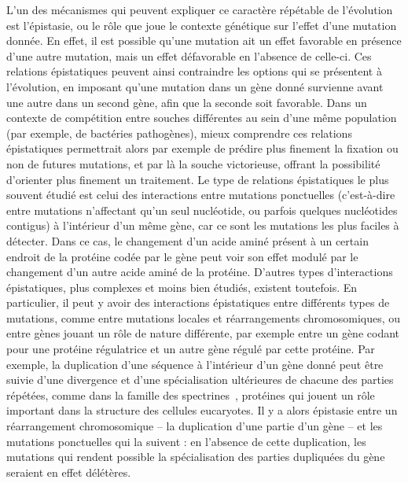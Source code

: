 L'un des mécanismes qui peuvent expliquer ce caractère répétable de l'évolution est l'épistasie, ou le rôle que joue le contexte génétique sur l'effet d'une mutation donnée.
En effet, il est possible qu'une mutation ait un effet favorable en présence d'une autre mutation, mais un effet défavorable en l'absence de celle-ci.
Ces relations épistatiques peuvent ainsi contraindre les options qui se présentent à l'évolution, en imposant qu'une mutation dans un gène donné survienne avant une autre dans un second gène, afin que la seconde soit favorable.
Dans un contexte de compétition entre souches différentes au sein d'une même population (par exemple, de bactéries pathogènes), mieux comprendre ces relations épistatiques permettrait alors par exemple de prédire plus finement la fixation ou non de futures mutations, et par là la souche victorieuse, offrant la possibilité d'orienter plus finement un traitement.
Le type de relations épistatiques le plus souvent étudié est celui des interactions entre mutations ponctuelles (c'est-à-dire entre mutations n'affectant qu'un seul nucléotide, ou parfois quelques nucléotides contigus) à l'intérieur d'un même gène, car ce sont les mutations les plus faciles à détecter.
Dans ce cas, le changement d'un acide aminé présent à un certain endroit de la protéine codée par le gène peut voir son effet modulé par le changement d'un autre acide aminé de la protéine.
D'autres types d'interactions épistatiques, plus complexes et moins bien étudiés, existent toutefois.
En particulier, il peut y avoir des interactions épistatiques entre différents types de mutations, comme entre mutations locales et réarrangements chromosomiques, ou entre gènes jouant un rôle de nature différente, par exemple entre un gène codant pour une protéine régulatrice et un autre gène régulé par cette protéine.
Par exemple, la duplication d'une séquence à l'intérieur d'un gène donné peut être suivie d'une divergence et d'une spécialisation ultérieures de chacune des parties répétées, comme dans la famille des spectrines~\citep{thomas1997}, protéines qui jouent un rôle important dans la structure des cellules eucaryotes.
Il y a alors épistasie entre un réarrangement chromosomique -- la duplication d'une partie d'un gène -- et les mutations ponctuelles qui la suivent : en l'absence de cette duplication, les mutations qui rendent possible la spécialisation des parties dupliquées du gène seraient en effet délétères.

